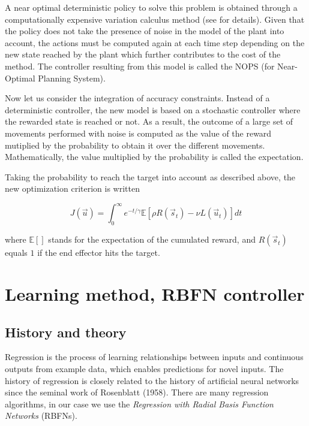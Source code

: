 \documentclass[pdftex,a4paper,11pt]{report}
\begin{document}
A near optimal deterministic policy to solve this problem is obtained through a computationally expensive variation calculus method (see \cite{rigoux_these} for details).
Given that the policy does not take the presence of noise in the model of the plant into account, 
the actions must be computed again at each time step depending on the new state reached by the plant
which further contributes to the cost of the method.
The controller resulting from this model is called the NOPS (for Near-Optimal Planning System).

Now let us consider the integration of accuracy constraints. Instead of a deterministic controller, the new model is based on a stochastic controller where the rewarded state is reached or not. As a result, the outcome of a large set of movements performed with noise is computed as the value of the reward mutiplied by the probability to obtain it over the different movements. 
Mathematically, the value multiplied by the probability is called the expectation.

Taking the probability to reach the target into account as described above, the new optimization criterion is written

\begin{equation}
\label{eq:expectation}
 J(\vec{u}) = \int_0^{\infty} e^{-t/\gamma} \mathbb{E}[ \rho R(\vec{s}_t) - \nu L(\vec{u}_t) ] dt
\end{equation}

where $\mathbb{E}[]$ stands for the expectation of the cumulated reward, and $R(\vec{s}_t)$  equals $1$ if the end effector hits the target.

\section{Learning method, RBFN controller}
\label{sec_rbfn}

\subsection{History and theory}
Regression is the process of learning relationships between inputs and continuous outputs from example data, which enables predictions for novel inputs.
The history of regression is closely related to the history of artificial neural networks since the seminal work of Rosenblatt (1958).
There are many regression algorithms, in our case we use the \textit{Regression with Radial Basis Function Networks} (RBFNs).
\end{document}
